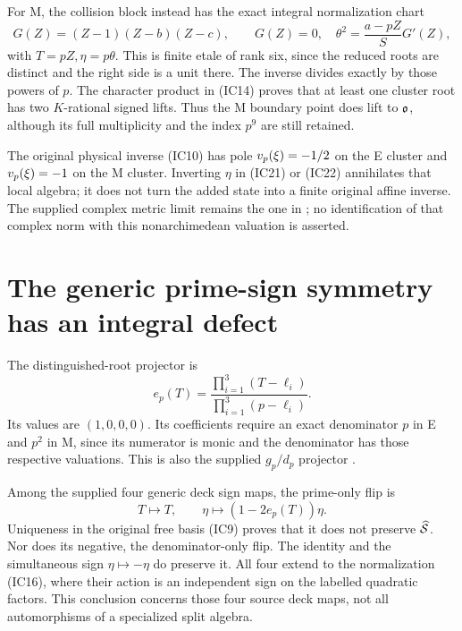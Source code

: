 For M, the collision block instead has the exact integral normalization chart
\[
 G(Z)=(Z-1)(Z-b)(Z-c),\qquad
 G(Z)=0,\quad \theta^2=\frac{a-pZ}{S}G'(Z),              \tag{IC24}
\]
with $T=pZ,\eta=p\theta$. This is finite etale of rank six, since the reduced
roots are distinct and the right side is a unit there. The inverse divides
exactly by those powers of $p$. The character product in (IC14) proves that
at least one cluster root has two $K$-rational signed lifts. Thus the M boundary
point does lift to $\mathfrak o$, although its full multiplicity and the index $p^9$
are still retained.

The original physical inverse (IC10) has pole $v_p(\xi)=-1/2$ on the E cluster
and $v_p(\xi)=-1$ on the M cluster. Inverting $\eta$ in (IC21) or (IC22)
annihilates that local algebra; it does not turn the added state into a finite
original affine inverse. The supplied complex metric limit remains the one in
\cite[equations (21)--(22)]{Input}; no identification of that complex norm with
this nonarchimedean valuation is asserted.

\section{The generic prime-sign symmetry has an integral defect}
The distinguished-root projector is
\[
 e_p(T)=\frac{\prod_{i=1}^3(T-\ell_i)}{\prod_{i=1}^3(p-\ell_i)}.
                                                               \tag{IC25}
\]
Its values are $(1,0,0,0)$. Its coefficients require an exact denominator $p$
in E and $p^2$ in M, since its numerator is monic and the denominator has
those respective valuations. This is also the supplied $g_p/d_p$ projector
\cite[equations (9)--(11)]{Input}.

Among the supplied four generic deck sign maps, the prime-only flip is
\[
 T\longmapsto T,\qquad \eta\longmapsto(1-2e_p(T))\eta.
                                                               \tag{IC26}
\]
Uniqueness in the original free basis (IC9) proves that it does not preserve
$\widehat{\mathcal S}$. Nor does its negative, the denominator-only flip. The identity and the
simultaneous sign $\eta\mapsto-\eta$ do preserve it. All four extend to the
normalization (IC16), where their action is an independent sign on the labelled
quadratic factors. This conclusion concerns those four source deck maps, not
all automorphisms of a specialized split algebra.

